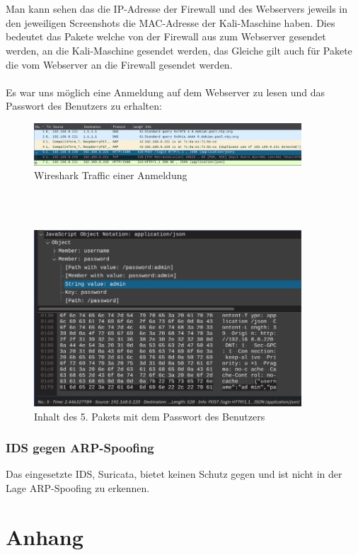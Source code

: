 \documentclass[
    a4paper,
    pagesize,
	pdftex,
    12pt,
]{scrartcl}
\begin{document}
\\ \\
Man kann sehen das die IP-Adresse der Firewall und des Webservers jeweils in den jeweiligen Screenshots die MAC-Adresse der Kali-Maschine haben. Dies bedeutet das Pakete welche von der Firewall aus zum Webserver gesendet werden, an die Kali-Maschine gesendet werden, das Gleiche gilt auch für Pakete die vom Webserver an die Firewall gesendet werden.
\\ \\
Es war uns möglich eine Anmeldung auf dem Webserver zu lesen und das Passwort des Benutzers zu erhalten:
\begin{figure}[!ht]
	\centering
	\includegraphics[width=10cm]{arp-shark-packete.png}
	\caption{Wireshark Traffic einer Anmeldung}
	\label{fig:arp-shark-packete.png}
\end{figure}
\\ \\
\begin{figure}[!ht]
	\centering
	\includegraphics[width=10cm]{arp-shark-packet-5.png}
	\caption{Inhalt des 5. Pakets mit dem Passwort des Benutzers}
	\label{fig:arp-shark-packet-5}
\end{figure} 

\subsubsection{IDS gegen ARP-Spoofing}
Das eingesetzte IDS, Suricata, bietet keinen Schutz gegen und ist nicht in der Lage ARP-Spoofing zu erkennen.

\newpage
\section{Anhang}
\end{document}
